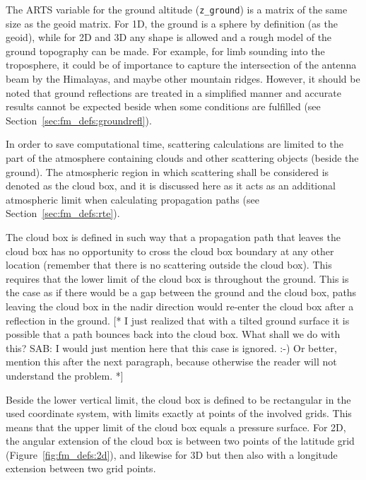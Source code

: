The ARTS variable for the ground altitude (\verb|z_ground|) is a
matrix of the same size as the geoid matrix.  For 1D, the ground is a
sphere by definition (as the geoid), while for 2D and 3D any shape is
allowed and a rough model of the ground topography can be made. For
example, for limb sounding into the troposphere, it could be of
importance to capture the intersection of the antenna beam by the
Himalayas, and maybe other mountain ridges.  However, it should be
noted that ground reflections are treated in a simplified manner and
accurate results cannot be expected beside when some conditions are
fulfilled (see Section~\ref{sec:fm_defs:groundrefl}).


\label{sec:fm_defs:cloudbox}

In order to save computational time, scattering calculations are
limited to the part of the atmosphere containing clouds and other
scattering objects (beside the ground). The atmospheric region in
which scattering shall be considered is denoted as the cloud box, and
it is discussed here as it acts as an additional atmospheric limit
when calculating propagation paths (see Section~\ref{sec:fm_defs:rte}). 

The cloud box is defined in such way that a propagation path that
leaves the cloud box has no opportunity to cross the cloud box
boundary at any other location (remember that there is no scattering
outside the cloud box). This requires that the lower limit of the
cloud box is throughout the ground. This is the case as if there would
be a gap between the ground and the cloud box, paths leaving the cloud
box in the nadir direction would re-enter the cloud box after a
reflection in the ground. [* I just realized that with a tilted ground
surface it is possible that a path bounces back into the cloud box.
What shall we do with this? SAB: I would just mention here that this
case is ignored. :-) Or better, mention this after the next paragraph,
because otherwise the reader will not understand the problem. *]

Beside the lower vertical limit, the cloud box is defined to be
rectangular in the used coordinate system, with limits exactly at
points of the involved grids. This means that the upper limit of the
cloud box equals a pressure surface. For 2D, the angular extension of
the cloud box is between two points of the latitude grid
(Figure~\ref{fig:fm_defs:2d}), and likewise for 3D but then also with
a longitude extension between two grid points.



